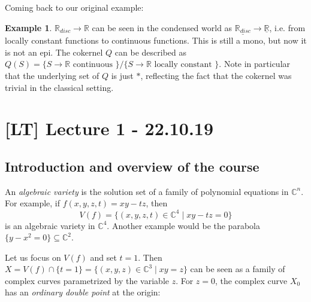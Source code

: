 \documentclass[11pt,A4]{article}
\theoremstyle{plain}
\theoremstyle{definition}
\newtheorem{exa}[thm]{Example}
\theoremstyle{remark}
\newcommand{\1}{\mathbbm{1}}
\newcommand{\C}{\mathbb{C}}
\renewcommand{\u}[1]{\underline{#1}}
\begin{document}
Coming back to our original example:

\begin{exa}
    $\mathbb{R}_{disc}\to \mathbb{R}$ can be seen in the condensed world as $\u{\mathbb{R}_{disc}}\to \u{\mathbb{R}}$, i.e. from locally constant functions to continuous functions.
    This is still a mono, but now it is not an epi.
    The cokernel $Q$ can be described as $Q(S)=\{ S\to \mathbb{R}\text{ continuous }\}/\{ S\to \mathbb{R}\text{ locally constant }\}$.
    Note in particular that the underlying set of $Q$ is just $*$, reflecting the fact that the cokernel was trivial in the classical setting.
\end{exa}

\section{[LT] Lecture 1 - 22.10.19}

\subsection{Introduction and overview of the course}

An \textit{algebraic variety} is the solution set of a family of polynomial equations in $\C^{n}$.
For example, if $f(x,y,z,t)=xy-tz$, then
\[ V(f)=\{(x,y,z,t)\in \C^{4}\mid xy-tz=0\} \]
is an algebraic variety in $\C^{4}$.
Another example would be the parabola $\{ y-x^{2}=0\}\subseteq \C^{2}$.

Let us focus on $V(f)$ and set $t=1$.
Then $X=V(f)\cap \{ t=1 \}=\{(x,y,z)\in \C^{3}\mid xy=z\}$ can be seen as a family of complex curves parametrized by the variable $z$.
For $z=0$, the complex curve $X_{0}$ has an \textit{ordinary double point} at the origin:
\end{document}
